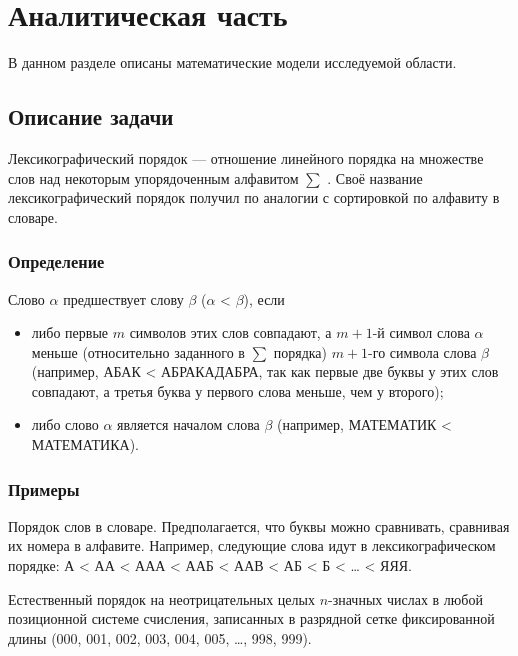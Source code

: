 \chapter{Аналитическая часть}

    В данном разделе описаны математические модели исследуемой области.

    \section{Описание задачи}

        Лексикографический порядок — отношение линейного порядка на множестве слов над некоторым упорядоченным алфавитом \( \sum \) . Своё название лексикографический порядок получил по аналогии с сортировкой по алфавиту в словаре. 
        
        \subsection*{Определение}
        
            Слово \( \alpha \) предшествует слову \( \beta \) (\( \alpha \) < \( \beta \)), если
            
            \begin{itemize}
                \item  либо первые \( m \) символов этих слов совпадают, а \( m+1 \)-й символ слова \( \alpha \) меньше (относительно заданного в \( \sum \) порядка) \( m + 1 \)-го символа слова \( \beta \) (например, АБАК < АБРАКАДАБРА, так как первые две буквы у этих слов совпадают, а третья буква у первого слова меньше, чем у второго);
                \item  либо слово \( \alpha \) является началом слова \( \beta \) (например, МАТЕМАТИК < МАТЕМАТИКА).
            \end{itemize}

        \subsection*{Примеры}

            Порядок слов в словаре. Предполагается, что буквы можно сравнивать, сравнивая их номера в алфавите. Например, следующие слова идут в лексикографическом порядке: А < АА < ААА < ААБ < ААВ < АБ < Б < … < ЯЯЯ.
    
            Естественный порядок на неотрицательных целых \(n\)-значных числах в любой позиционной системе счисления, записанных в разрядной сетке фиксированной длины (000, 001, 002, 003, 004, 005, …, 998, 999).
    
